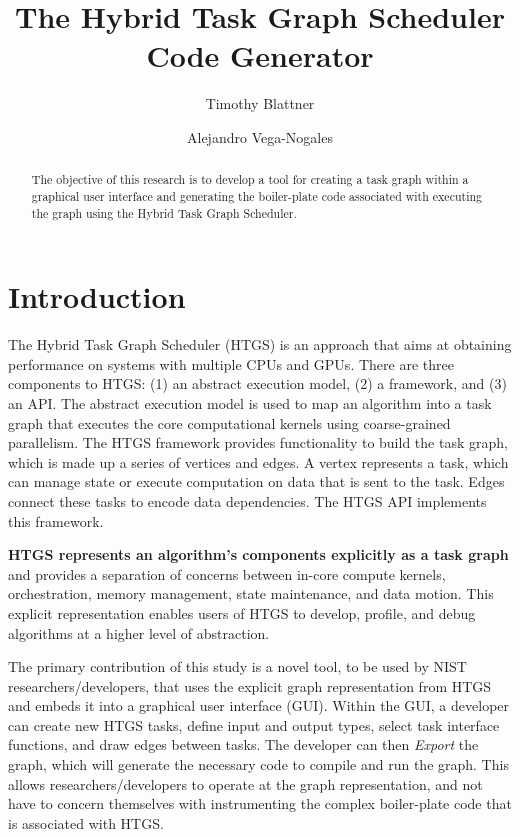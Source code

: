 \documentclass[]{article}
\begin{document}
\title{The Hybrid Task Graph Scheduler Code Generator}

\author{Timothy Blattner \and Alejandro Vega-Nogales}



%
%



\maketitle

\begin{abstract}
The objective of this research is to develop a tool for creating a task graph within a graphical user interface and generating the boiler-plate code associated with executing the graph using the Hybrid Task Graph Scheduler.
\end{abstract}

\section{Introduction}

The Hybrid Task Graph Scheduler (HTGS) is an approach that aims at obtaining performance on systems with multiple CPUs and GPUs. There are three components to HTGS: (1) an abstract execution model, (2) a framework, and (3) an API. The abstract execution model is used to map  an algorithm into a task graph that executes the core computational kernels using coarse-grained parallelism. The HTGS framework provides functionality to build the task graph, which is made up a series of vertices and edges. A vertex represents a task, which can manage state or execute computation on data that is sent to the task. Edges connect these tasks to encode data dependencies. The HTGS API implements this framework.

\textbf{HTGS represents an algorithm's components explicitly as a task graph} and provides a separation of concerns between in-core compute kernels, orchestration, memory management, state maintenance, and data motion. This explicit representation enables users of HTGS to develop, profile, and debug algorithms at a higher level of abstraction.

The primary contribution of this study is a novel tool, to be used by NIST researchers/developers, that uses the explicit graph representation from HTGS and embeds it into a graphical user interface (GUI). Within the GUI, a developer can create new HTGS tasks, define input and output types, select task interface functions, and draw edges between tasks. The developer can then \emph{Export} the graph, which will generate the necessary code to compile and run the graph. This allows researchers/developers to operate at the graph representation, and not have to concern themselves with instrumenting the complex boiler-plate code that is associated with HTGS.
\end{document}
